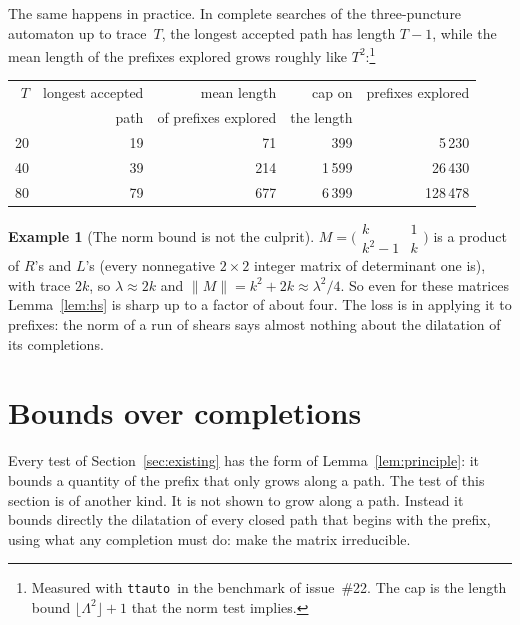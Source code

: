 \documentclass[11pt]{amsart}
\newcommand{\ttauto}{\texttt{ttauto}}
\newcommand{\lam}{\lambda}
\newcommand{\Lam}{\Lambda}
\newcommand{\nrm}[1]{\lVert #1\rVert}
\theoremstyle{plain}
\theoremstyle{definition}
\newtheorem{Example}[Theorem]{Example}
\begin{document}
The same happens in practice.  In complete searches of the
three-puncture automaton up to trace~$T$, the longest accepted path has
length $T-1$, while the mean length of the prefixes explored grows
roughly like $T^2$:\footnote{Measured with \ttauto\ in the benchmark of
issue~\#22.  The cap is the length bound $\lfloor\Lam^2\rfloor+1$ that the
norm test implies.}
\begin{center}
  \small
  \begin{tabular}{rrrrr}
    \toprule
    $T$ & longest accepted & mean length & cap on & prefixes explored \\
    & path & of prefixes explored & the length & \\
    \midrule
    20 & 19 & 71 & 399 & 5\,230 \\
    40 & 39 & 214 & 1\,599 & 26\,430 \\
    80 & 79 & 677 & 6\,399 & 128\,478 \\
    \bottomrule
  \end{tabular}
\end{center}

\begin{Example}[The norm bound is not the culprit]
  \label{ex:hssharp}
  $M=\bigl(\begin{smallmatrix}k&1\\k^2-1&k\end{smallmatrix}\bigr)$ is a
  product of $R$'s and $L$'s (every nonnegative $2\times2$ integer matrix of
  determinant one is), with trace $2k$, so $\lam\approx2k$ and
  $\nrm{M}=k^2+2k\approx\lam^2/4$.  So even for these matrices
  Lemma~\ref{lem:hs} is sharp up to a factor of about four.  The loss is in
  applying it to prefixes: the norm of a run of shears says almost nothing
  about the dilatation of its completions.
\end{Example}

\section{Bounds over completions}
\label{sec:completions}

Every test of Section~\ref{sec:existing} has the form of
Lemma~\ref{lem:principle}: it bounds a quantity of the prefix that only
grows along a path.  The test of this section is of another kind.  It is
not shown to grow along a path.  Instead it bounds directly the
dilatation of every closed path that begins with the prefix, using what
any completion must do: make the matrix irreducible.
\end{document}
